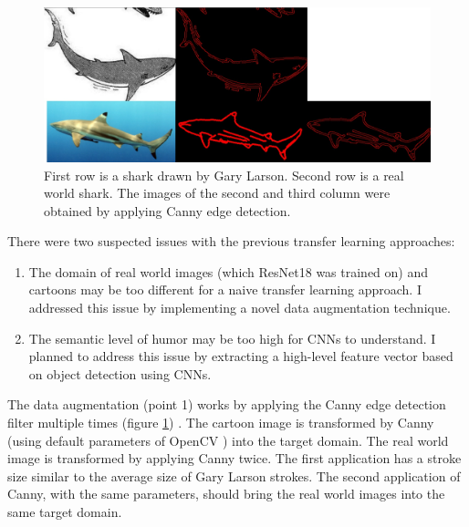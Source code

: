 \documentclass[draft,final,oneside]{vutinfth} %
\begin{document}
\begin{figure}[ht]
	\centering
  	\includegraphics[width=1.0\textwidth]{graphics/edge_edge_detection.jpg}
	\caption{First row is a shark drawn by Gary Larson. Second row is a real world shark. The images of the second and third column were obtained by applying Canny edge detection.}
	\label{fig:dataugmentation}
\end{figure}

There were two suspected issues with the previous transfer learning approaches:

\begin{enumerate}
\item The domain of real world images (which ResNet18 was trained on) and cartoons may be too different for a naive transfer learning approach. I addressed this issue by implementing a novel data augmentation technique.
\item The semantic level of humor may be too high for CNNs to understand. I planned to address this issue by extracting a high-level feature vector based on object detection using CNNs.
\end{enumerate}

The data augmentation (point 1) works by applying the Canny edge detection filter multiple times (figure \ref{fig:dataugmentation}) \cite{opencv_library}. The cartoon image is transformed by Canny (using default parameters of OpenCV \cite{opencv_library}) into the target domain. The real world image is transformed by applying Canny twice. The first application has a stroke size similar to the average size of Gary Larson strokes. The second application of Canny, with the same parameters, should bring the real world images into the same target domain.
\end{document}
